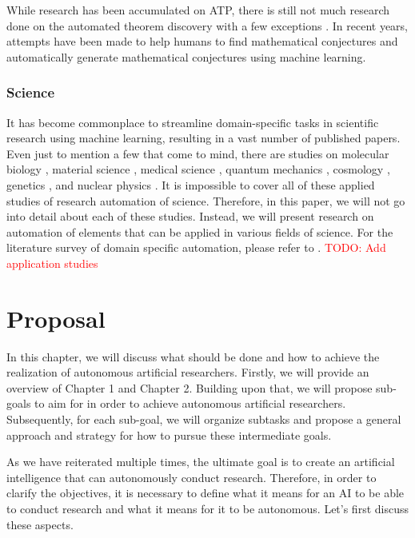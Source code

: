 \documentclass{book}
\begin{document}
 While research has been accumulated on ATP, there is still not much research done on the automated theorem discovery with a few exceptions \cite{gao2014systematic}. In recent years, attempts have been made to help humans to find mathematical conjectures \cite{davies2021advancing} and
 automatically generate mathematical conjectures \cite{raayoni2021generating}  using machine learning.

\subsection{Science}


It has become commonplace to streamline domain-specific tasks in scientific research using machine learning, resulting in a vast number of published papers. Even just to mention a few that come to mind, there are studies on molecular biology \cite{jumper2021highly,senior2020improved}, material science \cite{ramprasad2017machine}, medical science \cite{vamathevan2019applications,shorten2021deep}, quantum mechanics \cite{carleo2017solving}, cosmology \cite{carleo2019machine}, genetics \cite{libbrecht2015machine}, and nuclear physics \cite{degrave2022magnetic}. It is impossible to cover all of these applied studies of research automation of science. Therefore, in this paper, we will not go into detail about each of these studies. Instead, we will present research on automation of elements that can be applied in various fields of science. For the literature survey of domain specific automation, please refer to \cite{xu2021artificial}. \textcolor{red}{TODO: Add application studies}



\chapter{Proposal}
\label{chapter-proposal}
In this chapter, we will discuss what should be done and how to achieve the realization of autonomous artificial researchers. Firstly, we will provide an overview of Chapter 1 and Chapter 2. Building upon that, we will propose sub-goals to aim for in order to achieve autonomous artificial researchers. Subsequently, for each sub-goal, we will organize subtasks and propose a general approach and strategy for how to pursue these intermediate goals.

As we have reiterated multiple times, the ultimate goal is to create an artificial intelligence that can autonomously conduct research. Therefore, in order to clarify the objectives, it is necessary to define what it means for an AI to be able to conduct research and what it means for it to be autonomous. Let's first discuss these aspects.
\end{document}
